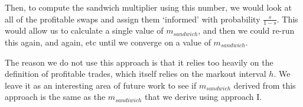 Then, to compute the sandwich multiplier using this number, we would look at all of the profitable swaps and assign them `informed' with probability $\frac{s}{1-s}$. This would allow us to calculate a single value of $m_{sandwich}$, and then we could re-run this again, and again, etc until we converge on a value of $m_{sandwich}$.

The reason we do not use this approach is that it relies too heavily on the definition of profitable trades, which itself relies on the markout interval $h$. We leave it as an interesting area of future work to see if $m_{sandwich}$ derived from this approach is the same as the $m_{sandiwich}$ that we derive using approach I.


